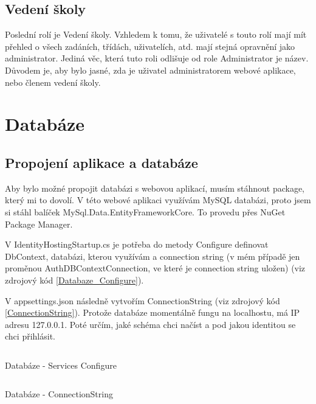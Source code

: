 \documentclass[a4paper, 12pt]{report}
\begin{document}
	\section{Vedení školy}
	Poslední rolí je Vedení školy. Vzhledem k tomu, že uživatelé s touto rolí mají mít přehled o všech zadáních, třídách, uživatelích, atd. mají stejná opravnění jako administrator. Jediná věc, která tuto roli odlišuje od role Administrator je název. Důvodem je, aby bylo jasné, zda je uživatel administratorem webové aplikace, nebo členem vedení školy.

	\chapter{Databáze} \label{Databaze}
	\section{Propojení aplikace a databáze}
	Aby bylo možné propojit databázi s webovou aplikací, musím stáhnout package, který mi to dovolí. V této webové aplikaci využívám MySQL databázi, proto jsem si stáhl balíček MySql.Data.EntityFrameworkCore. To provedu přes NuGet Package Manager.\par
	V IdentityHostingStartup.cs je potřeba do metody Configure definovat DbContext, databázi, kterou využívám a connection string (v mém případě jen proměnou AuthDBContextConnection, ve které je connection string uložen) (viz zdrojový kód \ref{Databaze_Configure}).\par
	V appsettings.json následně vytvořím ConnectionString (viz zdrojový kód \ref{ConnectionString}). Protože databáze momentálně fungu na localhostu, má IP adresu 127.0.0.1. Poté určím, jaké schéma chci načíst a pod jakou identitou se chci přihlásit.

	\begin{listing}[H]
		\inputminted{csharp}{SourceCode/Databaze/Databaze.cs}
		\caption{Databáze - Services Configure}
		\label{Databaze_Configure}
	\end{listing}

	\begin{listing}[H]
		\inputminted{json}{SourceCode/Databaze/ConnectionString.json}
		\caption{Databáze - ConnectionString}
		\label{ConnectionString}
	\end{listing}
\end{document}
